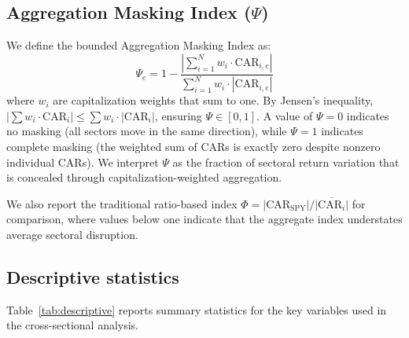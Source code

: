 \documentclass[12pt,preprint,authoryear]{elsarticle}
\begin{document}
\subsection{Aggregation Masking Index ($\Psi$)}
We define the bounded Aggregation Masking Index as:
\begin{equation}
    \Psi_e = 1 - \frac{\left|\sum_{i=1}^{N} w_i \cdot \text{CAR}_{i,e}\right|}{\sum_{i=1}^{N} w_i \cdot |\text{CAR}_{i,e}|}
\end{equation}
where $w_i$ are capitalization weights that sum to one. By Jensen's inequality, $|\sum w_i \cdot \text{CAR}_i| \leq \sum w_i \cdot |\text{CAR}_i|$, ensuring $\Psi \in [0,1]$. A value of $\Psi = 0$ indicates no masking (all sectors move in the same direction), while $\Psi = 1$ indicates complete masking (the weighted sum of CARs is exactly zero despite nonzero individual CARs). We interpret $\Psi$ as the fraction of sectoral return variation that is concealed through capitalization-weighted aggregation.

We also report the traditional ratio-based index $\Phi = |\text{CAR}_{\text{SPY}}| / \overline{|\text{CAR}_i|}$ for comparison, where values below one indicate that the aggregate index understates average sectoral disruption.

\subsection{Descriptive statistics}
Table~\ref{tab:descriptive} reports summary statistics for the key variables used in the cross-sectional analysis.
\end{document}
